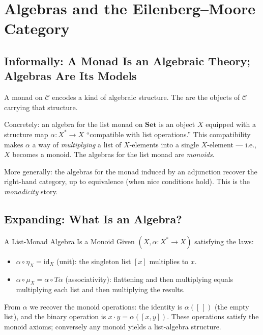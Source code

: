 \section{Algebras and the Eilenberg--Moore Category}
\label{sec:em-category}

\subsection{Informally: A Monad Is an Algebraic Theory; Algebras Are Its Models}

A monad on $\mathcal{C}$ encodes a kind of algebraic structure. The
 are the objects of $\mathcal{C}$ carrying
that structure.

Concretely: an algebra for the list monad on $\mathbf{Set}$ is an object
$X$ equipped with a structure map $\alpha : X^* \to X$ ``compatible with
list operations.'' This compatibility makes $\alpha$ a way of
\emph{multiplying} a list of $X$-elements into a single $X$-element ---
i.e., $X$ becomes a monoid. The algebras for the list monad are
\emph{monoids}.

More generally: the algebras for the monad induced by an adjunction
recover the right-hand category, up to equivalence (when nice conditions
hold). This is the \emph{monadicity} story.

\subsection{Expanding: What Is an Algebra?}

\begin{example}{A List-Monad Algebra Is a Monoid}
Given $(X, \alpha : X^* \to X)$ satisfying the laws:
\begin{itemize}
  \item $\alpha \circ \eta_X = \mathrm{id}_X$ (unit): the singleton list
        $[x]$ multiplies to $x$.
  \item $\alpha \circ \mu_X = \alpha \circ T \alpha$ (associativity):
        flattening and then multiplying equals multiplying each list
        and then multiplying the results.
\end{itemize}
From $\alpha$ we recover the monoid operations: the identity is
$\alpha([\,])$ (the empty list), and the binary operation is
$x \cdot y = \alpha([x, y])$. These operations satisfy the monoid
axioms; conversely any monoid yields a list-algebra structure.
\end{example}

